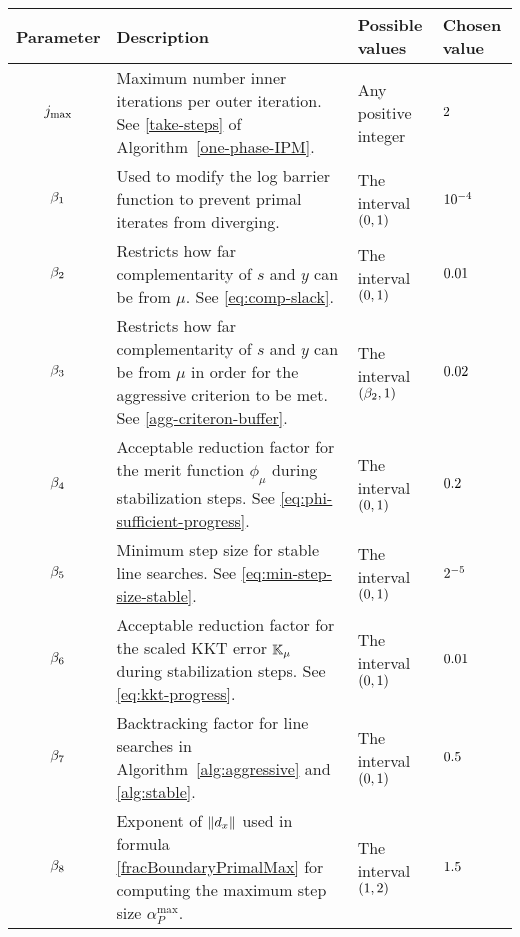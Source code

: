 \documentclass{article}
\begin{document}
\begin{table}[H]
\begin{tabular}{ |c| p{7cm}|p{4.0cm}| p{3cm}| } 
 \hline
Parameter & Description & Possible values & Chosen value  \\ 
 \hline
$j_{\max}$ & Maximum number inner iterations per outer iteration. See \eqref{take-steps} of Algorithm~\ref{one-phase-IPM}.  & Any positive integer & $2$  \\ 
\hline
$\beta_{1}$ & Used to modify the log barrier function to prevent primal iterates from diverging. & The interval $(0,1)$ & $10^{-4}$ \\
\hline
  $\beta_{2}$ & Restricts how far complementarity of $s$ and $y$ can be from $\mu$. See \eqref{eq:comp-slack}.  & The interval $(0,1)$ & $0.01$ \\ 
 \hline
   $\beta_{3}$ & Restricts how far complementarity of $s$ and $y$ can be from $\mu$ in order for the aggressive criterion to be met. See \eqref{agg-criteron-buffer}.  & The interval  $(\beta_{2},1)$ & $0.02$  \\ 
    \hline
            $\beta_{4}$ & Acceptable reduction factor for the merit function $\phi_{\mu}$ during stabilization steps. See \eqref{eq:phi-sufficient-progress}.  & The interval $(0,1)$ & $0.2$  \\
    \hline
   $\beta_{5}$ & Minimum step size for stable line searches. See \eqref{eq:min-step-size-stable}.  & The interval $(0,1)$ & $2^{-5}$  \\ 
   \hline 
      $\beta_{6}$ & Acceptable reduction factor for the scaled KKT error $\mathbb{K}_{\mu}$ during stabilization steps. See \eqref{eq:kkt-progress}.  & The interval $(0,1)$ & $0.01$ \\ 
      \hline
    $\beta_{7}$ & Backtracking factor for line searches in Algorithm~\ref{alg:aggressive} and \ref{alg:stable}. & The interval $(0,1)$ & $0.5$ \\
    \hline
$\beta_{8}$ & Exponent of $\| d_{x} \|$ used in \fracBound{} formula \eqref{fracBoundaryPrimalMax} for computing the maximum step size $\alpha_{P}^{\max}$. & The interval $(1,2)$ & $1.5$ \\

\end{tabular}
\end{table}
\end{document}
